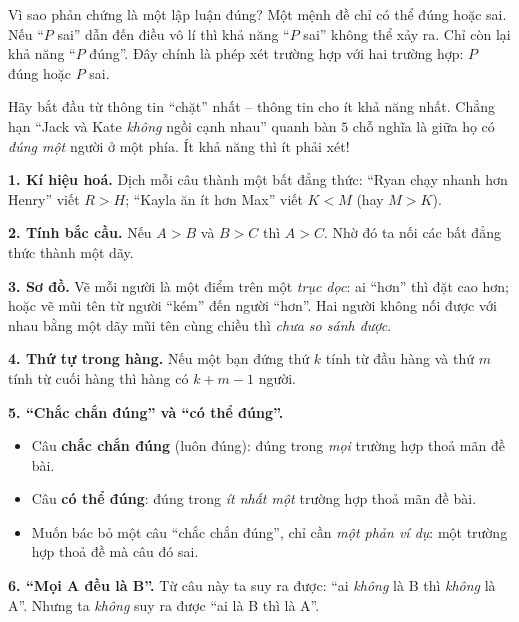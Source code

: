\begin{proofbox}
Vì sao phản chứng là một lập luận đúng? Một mệnh đề chỉ có thể đúng hoặc sai. Nếu ``$P$ sai'' dẫn đến điều vô lí thì khả năng
``$P$ sai'' không thể xảy ra. Chỉ còn lại khả năng ``$P$ đúng''. Đây chính là phép xét trường hợp với hai trường hợp: $P$ đúng
hoặc $P$ sai.
\end{proofbox}
\begin{tipbox}
Hãy bắt đầu từ thông tin ``chặt'' nhất -- thông tin cho ít khả năng nhất. Chẳng hạn ``Jack và Kate \emph{không} ngồi cạnh nhau''
quanh bàn $5$ chỗ nghĩa là giữa họ có \emph{đúng một} người ở một phía. Ít khả năng thì ít phải xét!
\end{tipbox}

\begin{knowbox}
\textbf{1. Kí hiệu hoá.} Dịch mỗi câu thành một bất đẳng thức: ``Ryan chạy nhanh hơn Henry'' viết $R > H$;
``Kayla ăn ít hơn Max'' viết $K < M$ (hay $M > K$).

\textbf{2. Tính bắc cầu.} Nếu $A > B$ và $B > C$ thì $A > C$. Nhờ đó ta nối các bất đẳng thức thành một dãy.

\textbf{3. Sơ đồ.} Vẽ mỗi người là một điểm trên một \emph{trục dọc}: ai ``hơn'' thì đặt cao hơn; hoặc vẽ mũi tên
từ người ``kém'' đến người ``hơn''. Hai người không nối được với nhau bằng một dãy mũi tên cùng chiều thì \emph{chưa so sánh được}.

\textbf{4. Thứ tự trong hàng.} Nếu một bạn đứng thứ $k$ tính từ đầu hàng và thứ $m$ tính từ cuối hàng thì hàng có
$k + m - 1$ người.

\textbf{5. ``Chắc chắn đúng'' và ``có thể đúng''.}
\begin{itemize}[leftmargin=1.4em,itemsep=1pt,topsep=2pt]
  \item Câu \textbf{chắc chắn đúng} (luôn đúng): đúng trong \emph{mọi} trường hợp thoả mãn đề bài.
  \item Câu \textbf{có thể đúng}: đúng trong \emph{ít nhất một} trường hợp thoả mãn đề bài.
  \item Muốn bác bỏ một câu ``chắc chắn đúng'', chỉ cần \emph{một phản ví dụ}: một trường hợp thoả đề mà câu đó sai.
\end{itemize}

\textbf{6. ``Mọi A đều là B''.} Từ câu này ta suy ra được: ``ai \emph{không} là B thì \emph{không} là A''. Nhưng ta
\emph{không} suy ra được ``ai là B thì là A''.
\end{knowbox}
